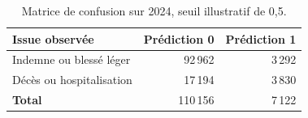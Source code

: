 \begin{table}[htbp]
\centering\small
\renewcommand{\arraystretch}{1.18}
\caption{Matrice de confusion sur 2024, seuil illustratif de 0,5.}\label{tab:ml-confusion}
\begin{tabularx}{\textwidth}{@{}Lrr@{}}
\toprule
Issue observée & Prédiction 0 & Prédiction 1 \\
\midrule
Indemne ou blessé léger & 92\,962 & 3\,292 \\
Décès ou hospitalisation & 17\,194 & 3\,830 \\
\textbf{Total} & 110\,156 & 7\,122 \\
\bottomrule
\end{tabularx}
\end{table}
